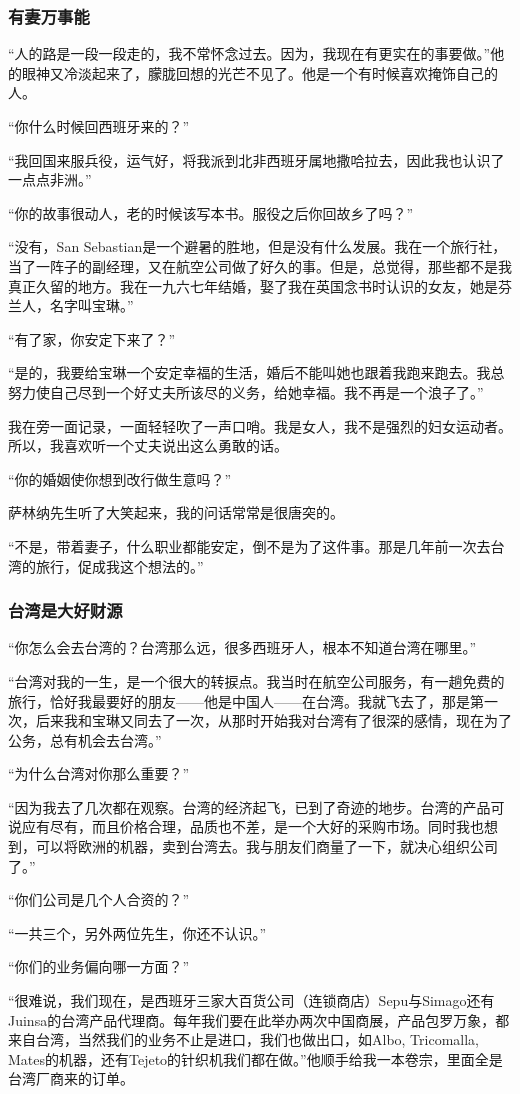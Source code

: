 \subsubsection*{有妻万事能}
\par “人的路是一段一段走的，我不常怀念过去。因为，我现在有更实在的事要做。”他的眼神又冷淡起来了，朦胧回想的光芒不见了。他是一个有时候喜欢掩饰自己的人。
\par “你什么时候回西班牙来的？”
\par “我回国来服兵役，运气好，将我派到北非西班牙属地撒哈拉去，因此我也认识了一点点非洲。”
\par “你的故事很动人，老的时候该写本书。服役之后你回故乡了吗？”
\par “没有，San Sebastian是一个避暑的胜地，但是没有什么发展。我在一个旅行社，当了一阵子的副经理，又在航空公司做了好久的事。但是，总觉得，那些都不是我真正久留的地方。我在一九六七年结婚，娶了我在英国念书时认识的女友，她是芬兰人，名字叫宝琳。”
\par “有了家，你安定下来了？”
\par “是的，我要给宝琳一个安定幸福的生活，婚后不能叫她也跟着我跑来跑去。我总努力使自己尽到一个好丈夫所该尽的义务，给她幸福。我不再是一个浪子了。”
\par 我在旁一面记录，一面轻轻吹了一声口哨。我是女人，我不是强烈的妇女运动者。所以，我喜欢听一个丈夫说出这么勇敢的话。
\par “你的婚姻使你想到改行做生意吗？”
\par 萨林纳先生听了大笑起来，我的问话常常是很唐突的。
\par “不是，带着妻子，什么职业都能安定，倒不是为了这件事。那是几年前一次去台湾的旅行，促成我这个想法的。”
\subsubsection*{台湾是大好财源}
\par “你怎么会去台湾的？台湾那么远，很多西班牙人，根本不知道台湾在哪里。”
\par “台湾对我的一生，是一个很大的转捩点。我当时在航空公司服务，有一趟免费的旅行，恰好我最要好的朋友——他是中国人——在台湾。我就飞去了，那是第一次，后来我和宝琳又同去了一次，从那时开始我对台湾有了很深的感情，现在为了公务，总有机会去台湾。”
\par “为什么台湾对你那么重要？”
\par “因为我去了几次都在观察。台湾的经济起飞，已到了奇迹的地步。台湾的产品可说应有尽有，而且价格合理，品质也不差，是一个大好的采购市场。同时我也想到，可以将欧洲的机器，卖到台湾去。我与朋友们商量了一下，就决心组织公司了。”
\par “你们公司是几个人合资的？”
\par “一共三个，另外两位先生，你还不认识。”
\par “你们的业务偏向哪一方面？”
\par “很难说，我们现在，是西班牙三家大百货公司（连锁商店）Sepu与Simago还有Juinsa的台湾产品代理商。每年我们要在此举办两次中国商展，产品包罗万象，都来自台湾，当然我们的业务不止是进口，我们也做出口，如Albo, Tricomalla, Mates的机器，还有Tejeto的针织机我们都在做。”他顺手给我一本卷宗，里面全是台湾厂商来的订单。
